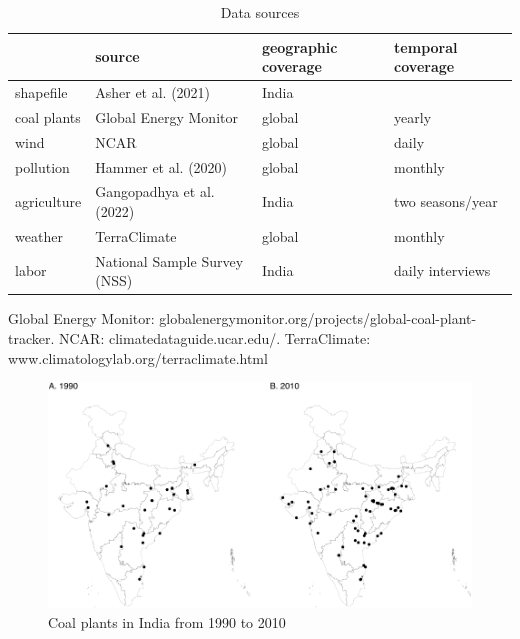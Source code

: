 \documentclass[
]{article}
\begin{document}
\begin{table}[H]

\caption{\label{tab:data}Data sources}
\centering
\begin{threeparttable}
\begin{tabular}[t]{>{\raggedright\arraybackslash}p{2cm}>{\centering\arraybackslash}p{5cm}>{\centering\arraybackslash}p{3cm}>{\centering\arraybackslash}p{3cm}}
\toprule
  & source & geographic coverage & temporal coverage\\
\midrule
shapefile & Asher et al. (2021) & India & \\
coal plants & Global Energy Monitor & global & yearly\\
wind & NCAR & global & daily\\
pollution & Hammer et al. (2020) & global & monthly\\
agriculture & Gangopadhya et al. (2022) & India & two seasons/year\\
weather & TerraClimate & global & monthly\\
labor & National Sample Survey (NSS) & India & daily interviews\\
\bottomrule
\end{tabular}
\begin{tablenotes}[para]
\item Global Energy Monitor: globalenergymonitor.org/projects/global-coal-plant-tracker. NCAR: climatedataguide.ucar.edu/. TerraClimate: www.climatologylab.org/terraclimate.html
\end{tablenotes}
\end{threeparttable}
\end{table}

\FloatBarrier
\newpage

\begin{figure}
\includegraphics{draft_files/figure-latex/plants-1} \caption[Coal plants in India from 1990 to 2010]{Coal plants in India from 1990 to 2010}\label{fig:plants}
\end{figure}
\end{document}
